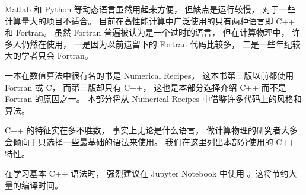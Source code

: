 
Matlab 和 Python 等动态语言虽然用起来方便， 但缺点是运行较慢， 对于一些计算量大的项目不适合。 目前在高性能计算中广泛使用的只有两种语言即 C++ 和 Fortran。 虽然 Fortran 普遍被认为是一个过时的语言， 但在计算物理中， 许多人仍然在使用， 一是因为以前遗留下的 Fortran 代码比较多， 二是一些年纪较大的学者只会 Fortran。

一本在数值算法中很有名的书是 Numerical Recipes， 这本书第三版以前都使用 Fortran 或 C， 而第三版却只有 C++， 这也是本部分选择介绍 C++ 而不是 Fortran 的原因之一。 本部分将从 Numerical Recipes 中借鉴许多代码上的风格和算法。

C++ 的特征实在多不胜数， 事实上无论是什么语言， 做计算物理的研究者大多会倾向于只选择一些最基础的语法来使用。 我们在这里列出本部分使用的 C++ 特性。

在学习基本 C++ 语法时， 强烈建议在 Jupyter Notebook 中使用 。这将节约大量的编译时间。

